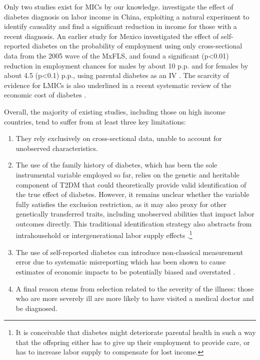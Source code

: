 \documentclass[12pt,english]{article}
\begin{document}
Only two studies exist for \ac{MICs} by our knowledge. \textcite{Liu2014} investigate the effect of diabetes diagnosis on labor income in China, exploiting a natural experiment to identify causality and find a significant reduction in income for those with a recent diagnosis. An earlier study for Mexico investigated the effect of self-reported diabetes on the probability of employment using only cross-sectional data from the 2005 wave of the \ac{MxFLS}, and found a significant (p<0.01) reduction in employment chances for males by about 10 \ac{p.p.} and for females by about 4.5 (p<0.1) \ac{p.p.}, using parental diabetes as an \ac{IV} \parencite{Seuring2015}. The scarcity of evidence for \ac{LMICs} is also underlined in a recent systematic review of the economic cost of diabetes \parencite{Seuring2015a}. 


Overall, the majority of existing studies, including those on high income countries, tend to suffer from at least three key limitations: 
\begin{enumerate}
\item  They rely exclusively on cross-sectional data, unable to account for unobserved characteristics.
\item The use of the family history of diabetes, which has been the sole instrumental variable employed so far, relies on the genetic and heritable component of \ac{T2DM} that could theoretically provide valid identification of the true effect of diabetes. However, it remains unclear whether the variable fully satisfies the exclusion restriction, as it may also proxy for other genetically transferred traits, including unobserved abilities that impact labor outcomes directly. This traditional identification strategy also abstracts from intrahousehold or intergenerational labor supply effects \parencite{Seuring2015}.\footnote{It is conceivable that diabetes might deteriorate parental health in such a way that the offspring either has to give up their employment to provide care, or has to increase labor supply to compensate for lost income.}
\item The use of self-reported diabetes can introduce non-classical measurement error due to systematic misreporting which has been shown to cause estimates of economic impacts to be potentially biased and overstated \parencite{Cawley2015,ONeill2013,Perks2015}.
\item A final reason stems from selection related to the severity of the illness: those who are more severely ill are more likely to have visited a medical doctor and be diagnosed.  
\end{enumerate}
\end{document}

